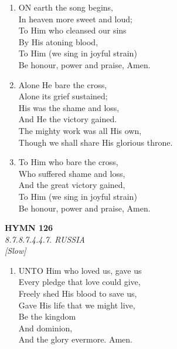 \begin{enumerate}
    \item ON earth the song begins, \\
        In heaven more sweet and loud; \\
        To Him who cleansed our sins \\
        By His atoning blood, \\
        To Him (we sing in joyful strain) \\
        Be honour, power and praise, Amen.

    \item Alone He bare the cross, \\
        Alone its grief sustained; \\
        His was the shame and loss, \\
        And He the victory gained. \\
        The mighty work was all His own, \\
        Though we shall share His glorious throne.

    \item To Him who bare the cross, \\
        Who suffered shame and loss, \\
        And the great victory gained, \\
        To Him (we sing in joyful strain) \\
        Be honour, power and praise, Amen.

\end{enumerate}

\newpage
\begin{center}
    {\Large \textbf{HYMN 126}}
    \\
    \textit{8.7.8.7.4.4.7. RUSSIA}
    \\
    \textit{\small [Slow]}
\end{center}
\vspace{1em}

\begin{enumerate}
    \item UNTO Him who loved us, gave us \\
        Every pledge that love could give, \\
        Freely shed His blood to save us, \\
        Gave His life that we might live, \\
        Be the kingdom \\
        And dominion, \\
        And the glory evermore. Amen.

\end{enumerate}

